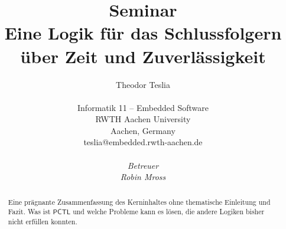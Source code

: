 \documentclass{lni}
\author{
	Theodor Teslia \\ 
	\\ 
	Informatik 11 -- Embedded Software \\ 
	RWTH Aachen University \\ 
	Aachen, Germany \\ 
	teslia@embedded.rwth-aachen.de\\
	\\
	\textit{Betreuer}\\
	\textit{Robin Mross}\\ %
}
\title{\small{Seminar} \\ \vspace{0.5cm} \Large{Eine Logik für das Schlussfolgern über Zeit und Zuverlässigkeit}}
\theoremstyle{def_style}
\theoremstyle{break}
\newcommand{\PCTL}{\mathsf{PCTL}}
\begin{document}
\maketitle

\begin{abstract}
Eine prägnante Zusammenfassung des Kerninhaltes ohne thematische Einleitung und Fazit. Was ist $\PCTL$ und welche Probleme kann es lösen, die andere Logiken bisher nicht erfüllen konnten.
\end{abstract}







% 








\end{document}
